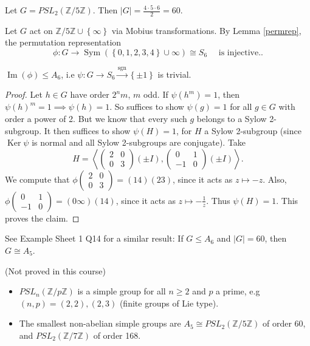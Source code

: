 \documentclass[egregdoesnotlikesansseriftitles,a4paper]{scrartcl}
\begin{document}
\begin{example*}
      Let $G=PSL_2 (\mathbb{Z}/5\mathbb{Z})$. Then $|G|= \frac{4 \cdot 5 \cdot  6}{2}=60$. 
      
      Let $G$ act on $\mathbb{Z}/5\mathbb{Z} \cup \left\{ \infty\right\}$ via Mobius transformations. By Lemma \ref{permrep}, the permutation representation \[
      \phi: G \rightarrow \operatorname{Sym}(\left\{0,1,2,3,4\right\}\cup \infty) \cong S_{6} \quad  \text{ is injective.}
      .\]
      \begin{claim}
            $\operatorname{Im} (\phi) \leq A_6 $, i.e $\psi: G \rightarrow S_6 \xrightarrow{\operatorname{sgn}} \left\{\pm 1\right\}$ is trivial. 
      \end{claim}
      \begin{proof}
            Let $h \in G$ have order $2^{n}m$, $m$ odd. If $\psi (h^{m})=1$, then $\psi (h)^{m}=1 \implies \psi (h)=1$. So suffices to show $\psi (g)=1$ for all $g \in G$ with order a power of 2. But we know that every such $g$ belongs to a Sylow 2-subgroup. It then suffices to show $\psi (H)=1$, for $H$ a Sylow 2-subgroup (since $\operatorname{Ker} \psi$ is normal and all Sylow 2-subgroups are conjugate). Take \[
                  H=\left\langle \begin{pmatrix} 2&0\\0&3 \end{pmatrix}(\pm I),\begin{pmatrix} 0&1\\-1&0 \end{pmatrix} (\pm I)\right\rangle
              .\] We compute that $\phi \begin{pmatrix} 2&0\\0&3 \end{pmatrix}= (14)(23)$, since it acts as $z \mapsto -z$. Also, $\phi \begin{pmatrix} 0&1\\-1&0 \end{pmatrix}= (0 \infty)(14)$, since it acts as $z \mapsto -\frac{1}{z}$. Thus $\psi (H)=1$. This proves the claim. 
      \end{proof}
      See Example Sheet 1 Q14 for a similar result: If $G \leq A_6 $ and $|
      G|=60$, then $G \cong A_5 $.
\end{example*}
\begin{remarks}
      (Not proved in this course)\hfill 
      \begin{itemize}
           \item $PSL_n (\mathbb{Z}/p\mathbb{Z})$ is a simple group for all $n \geq 2$ and $p$ a prime, e.g $(n,p)=(2,2), (2,3)$ (finite groups of Lie type). 
           \item The smallest non-abelian simple groups are $A_5 \cong PSL_2 (\mathbb{Z}/5\mathbb{Z})$ of order 60, and $PSL_2 (\mathbb{Z}/7\mathbb{Z})$ of order 168.
      \end{itemize}
\end{remarks}
\end{document}
